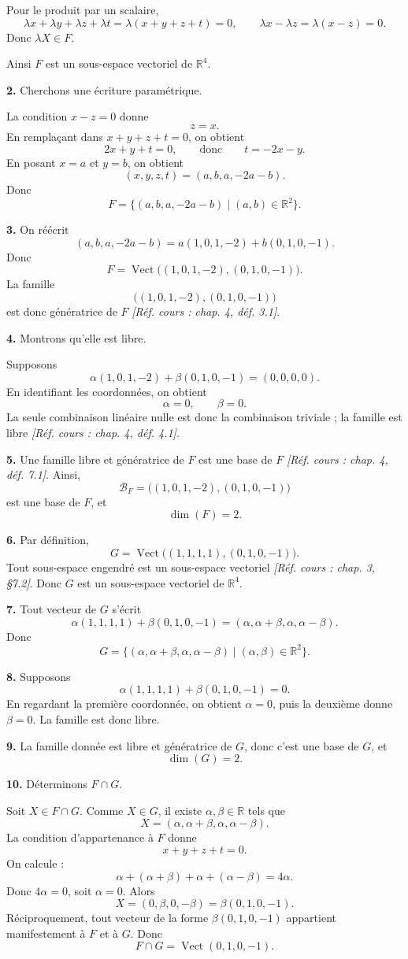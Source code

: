 \documentclass[11pt,a4paper]{article}
\newcommand{\R}{\mathbb{R}}
\newcommand{\Vect}{\operatorname{Vect}}
\newcommand{\dimv}{\operatorname{dim}}
\newcommand{\cours}[1]{\textit{[Réf. cours : #1]}}
\newcommand{\p}[1]{\medskip\noindent\textbf{#1.}}
\begin{document}
Pour le produit par un scalaire,
\[
\lambda x+\lambda y+\lambda z+\lambda t=\lambda(x+y+z+t)=0,
\qquad
\lambda x-\lambda z=\lambda(x-z)=0.
\]
Donc $\lambda X\in F$.

Ainsi $F$ est un sous-espace vectoriel de $\R^4$.

\p{2} Cherchons une écriture paramétrique.

La condition $x-z=0$ donne
\[
z=x.
\]
En remplaçant dans $x+y+z+t=0$, on obtient
\[
2x+y+t=0,
\qquad\text{donc}\qquad t=-2x-y.
\]
En posant $x=a$ et $y=b$, on obtient
\[
(x,y,z,t)=(a,b,a,-2a-b).
\]
Donc
\[
F=\{(a,b,a,-2a-b)\mid (a,b)\in\R^2\}.
\]

\p{3} On réécrit
\[
(a,b,a,-2a-b)=a(1,0,1,-2)+b(0,1,0,-1).
\]
Donc
\[
F=\Vect\bigl((1,0,1,-2),(0,1,0,-1)\bigr).
\]
La famille
\[
\bigl((1,0,1,-2),(0,1,0,-1)\bigr)
\]
est donc génératrice de $F$ \cours{chap. 4, déf. 3.1}.

\p{4} Montrons qu'elle est libre.

Supposons
\[
\alpha(1,0,1,-2)+\beta(0,1,0,-1)=(0,0,0,0).
\]
En identifiant les coordonnées, on obtient
\[
\alpha=0,\qquad \beta=0.
\]
La seule combinaison linéaire nulle est donc la combinaison triviale ; la famille est libre \cours{chap. 4, déf. 4.1}.

\p{5} Une famille libre et génératrice de $F$ est une base de $F$ \cours{chap. 4, déf. 7.1}. Ainsi,
\[
\mathcal B_F=\bigl((1,0,1,-2),(0,1,0,-1)\bigr)
\]
est une base de $F$, et
\[
\dimv(F)=2.
\]

\p{6} Par définition,
\[
G=\Vect\bigl((1,1,1,1),(0,1,0,-1)\bigr).
\]
Tout sous-espace engendré est un sous-espace vectoriel \cours{chap. 3, §7.2}. Donc $G$ est un sous-espace vectoriel de $\R^4$.

\p{7} Tout vecteur de $G$ s'écrit
\[
\alpha(1,1,1,1)+\beta(0,1,0,-1)=(\alpha,\alpha+\beta,\alpha,\alpha-\beta).
\]
Donc
\[
G=\{(\alpha,\alpha+\beta,\alpha,\alpha-\beta)\mid (\alpha,\beta)\in\R^2\}.
\]

\p{8} Supposons
\[
\alpha(1,1,1,1)+\beta(0,1,0,-1)=0.
\]
En regardant la première coordonnée, on obtient $\alpha=0$, puis la deuxième donne $\beta=0$.
La famille est donc libre.

\p{9} La famille donnée est libre et génératrice de $G$, donc c'est une base de $G$, et
\[
\dimv(G)=2.
\]

\p{10} Déterminons $F\cap G$.

Soit $X\in F\cap G$. Comme $X\in G$, il existe $\alpha,\beta\in\R$ tels que
\[
X=(\alpha,\alpha+\beta,\alpha,\alpha-\beta).
\]
La condition d'appartenance à $F$ donne
\[
x+y+z+t=0.
\]
On calcule :
\[
\alpha+(\alpha+\beta)+\alpha+(\alpha-\beta)=4\alpha.
\]
Donc $4\alpha=0$, soit $\alpha=0$.
Alors
\[
X=(0,\beta,0,-\beta)=\beta(0,1,0,-1).
\]
Réciproquement, tout vecteur de la forme $\beta(0,1,0,-1)$ appartient manifestement à $F$ et à $G$.
Donc
\[
F\cap G=\Vect(0,1,0,-1).
\]
\end{document}
